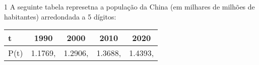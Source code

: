 \documentclass["CN_A-Exercises_Resolutions.tex"]{subfiles}
\begin{document}
\setcounter{question}{17}

\begin{questionBox}1{ %
    A seguinte tabela represetna a população da China (em milhares de milhões de habitantes) arredondada a 5 dígitos:
} %
    \begin{center}
        \vspace{1ex}
        \begin{tabular}{L || *{4}{C}}
            
                t & 1990 & 2000 & 2010 & 2020
            
            \\\hline
            
                P(t) 
                & 1.1769,
                & 1.2906,
                & 1.3688,
                & 1.4393,
            

\end{tabular}
\end{center}
\end{questionBox}
\end{document}
